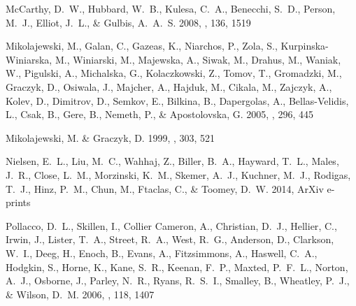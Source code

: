 \documentclass{emulateapj}
\begin{document}
\begin{thebibliography}{45}
{McCarthy}, D.~W., {Hubbard}, W.~B., {Kulesa}, C.~A., {Benecchi}, S.~D.,
  {Person}, M.~J., {Elliot}, J.~L., \& {Gulbis}, A.~A.~S. 2008, \aj, 136, 1519

{Mikolajewski}, M., {Galan}, C., {Gazeas}, K., {Niarchos}, P., {Zola}, S.,
  {Kurpinska-Winiarska}, M., {Winiarski}, M., {Majewska}, A., {Siwak}, M.,
  {Drahus}, M., {Waniak}, W., {Pigulski}, A., {Michalska}, G., {Kolaczkowski},
  Z., {Tomov}, T., {Gromadzki}, M., {Graczyk}, D., {Osiwala}, J., {Majcher},
  A., {Hajduk}, M., {Cikala}, M., {Zajczyk}, A., {Kolev}, D., {Dimitrov}, D.,
  {Semkov}, E., {Bilkina}, B., {Dapergolas}, A., {Bellas-Velidis}, L., {Csak},
  B., {Gere}, B., {Nemeth}, P., \& {Apostolovska}, G. 2005, \apss, 296, 445

{Mikolajewski}, M. \& {Graczyk}, D. 1999, \mnras, 303, 521

{Nielsen}, E.~L., {Liu}, M.~C., {Wahhaj}, Z., {Biller}, B.~A., {Hayward},
  T.~L., {Males}, J.~R., {Close}, L.~M., {Morzinski}, K.~M., {Skemer}, A.~J.,
  {Kuchner}, M.~J., {Rodigas}, T.~J., {Hinz}, P.~M., {Chun}, M., {Ftaclas}, C.,
  \& {Toomey}, D.~W. 2014, ArXiv e-prints

{Pollacco}, D.~L., {Skillen}, I., {Collier Cameron}, A., {Christian}, D.~J.,
  {Hellier}, C., {Irwin}, J., {Lister}, T.~A., {Street}, R.~A., {West}, R.~G.,
  {Anderson}, D., {Clarkson}, W.~I., {Deeg}, H., {Enoch}, B., {Evans}, A.,
  {Fitzsimmons}, A., {Haswell}, C.~A., {Hodgkin}, S., {Horne}, K., {Kane},
  S.~R., {Keenan}, F.~P., {Maxted}, P.~F.~L., {Norton}, A.~J., {Osborne}, J.,
  {Parley}, N.~R., {Ryans}, R.~S.~I., {Smalley}, B., {Wheatley}, P.~J., \&
  {Wilson}, D.~M. 2006, \pasp, 118, 1407


\end{thebibliography}
\end{document}
